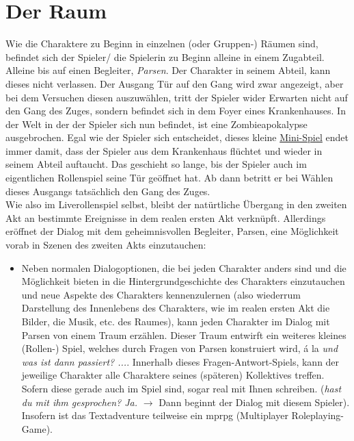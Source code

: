 \documentclass[12pt, a4paper, openany]{report}
\begin{document}
\section{Der Raum} \label{der-raum}
Wie die Charaktere zu Beginn in einzelnen (oder Gruppen-) Räumen sind, befindet sich der Spieler/ die Spielerin zu Beginn alleine in einem Zugabteil. 
Alleine bis auf einen Begleiter, \textit{Parsen}.
Der Charakter in seinem Abteil, kann dieses nicht verlassen. 
Der Ausgang \glqq Tür auf den Gang\grqq{} wird zwar angezeigt, aber bei dem Versuchen diesen auszuwählen, tritt der Spieler wider Erwarten nicht auf den Gang des Zuges, sondern befindet sich in dem Foyer eines Krankenhauses. 
In der Welt in der der Spieler sich nun befindet, ist eine Zombieapokalypse ausgebrochen. 
Egal wie der Spieler sich entscheidet, dieses kleine \hyperref[zombieapokalypse]{Mini-Spiel} endet immer damit, dass der Spieler aus dem Krankenhaus flüchtet und wieder in seinem Abteil auftaucht.
Das geschieht so lange, bis der Spieler auch im eigentlichen Rollenspiel seine Tür geöffnet hat.
Ab dann betritt er bei Wählen dieses Ausgangs tatsächlich den Gang des Zuges.\\
Wie also im Liverollenspiel selbst, bleibt der \glqq natürtliche\grqq{} Übergang in den zweiten Akt an bestimmte Ereignisse in dem \glqq realen\grqq{} ersten Akt verknüpft. 
Allerdings eröffnet der Dialog mit dem geheimnisvollen Begleiter, Parsen, eine Möglichkeit vorab in Szenen des zweiten Akts einzutauchen: 
\begin{itemize}
\item[] Neben normalen Dialogoptionen, die bei jeden Charakter anders sind und die Möglichkeit bieten in die Hintergrundgeschichte des Charakters einzutauchen und neue Aspekte des Charakters kennenzulernen (also wiederrum Darstellung des Innenlebens des Charakters, wie im realen ersten Akt die Bilder, die Musik, etc. des Raumes), kann jeden Charakter im Dialog mit Parsen von einem Traum erzählen. 
Dieser Traum entwirft ein weiteres kleines (Rollen-) Spiel, welches durch Fragen von Parsen konstruiert wird, á la \textit{und was ist dann passiert? ...}. 
Innerhalb dieses Fragen-Antwort-Spiels, kann der jeweilige Charakter alle Charaktere seines (späteren) Kollektives treffen.
Sofern diese gerade auch im Spiel sind, sogar real mit Ihnen schreiben. (\textit{\frqq hast du mit ihm gesprochen?\flqq{} \frqq Ja\flqq.} $\rightarrow$ Dann beginnt der Dialog mit diesem Spieler).
Insofern ist das Textadventure teilweise ein mprpg (Multiplayer Roleplaying-Game).
\end{itemize}
\end{document}

